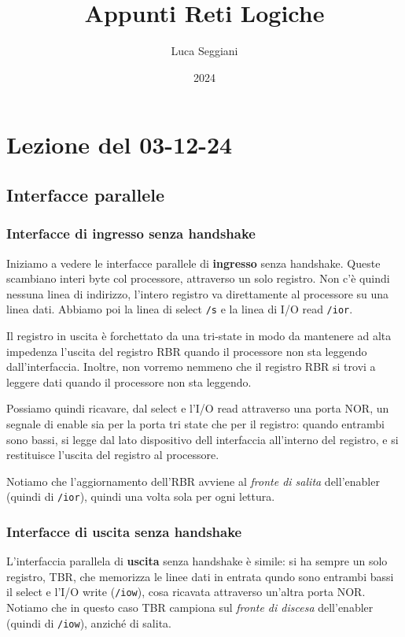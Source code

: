 \documentclass[a4paper,11pt]{article}
\title{Appunti Reti Logiche}
\author{Luca Seggiani}
\date{2024}
\begin{document}
\section{Lezione del 03-12-24}

\thispagestyle{empty}
\pagestyle{fancy}

\subsection{Interfacce parallele}
\subsubsection{Interfacce di ingresso senza handshake}
Iniziamo a vedere le interfacce parallele di \textbf{ingresso} senza handshake.
Queste scambiano interi byte col processore, attraverso un solo registro.
Non c'è quindi nessuna linea di indirizzo, l'intero registro va direttamente al processore su una linea dati.
Abbiamo poi la linea di select \lstinline|/s| e la linea di I/O read \lstinline|/ior|.

Il registro in uscita è forchettato da una tri-state in modo da mantenere ad alta impedenza l'uscita del registro RBR quando il processore non sta leggendo dall'interfaccia. 
Inoltre, non vorremo nemmeno che il registro RBR si trovi a leggere dati quando il processore non sta leggendo.

Possiamo quindi ricavare, dal select e l'I/O read attraverso una porta NOR, un segnale di enable sia per la porta tri state che per il registro: quando entrambi sono bassi, si legge dal lato dispositivo dell interfaccia all'interno del registro, e si restituisce l'uscita del registro al processore.

Notiamo che l'aggiornamento dell'RBR avviene al \textit{fronte di salita} dell'enabler (quindi di \lstinline|/ior|), quindi una volta sola per ogni lettura.

\subsubsection{Interfacce di uscita senza handshake}
L'interfaccia parallela di \textbf{uscita} senza handshake è simile: si ha sempre un solo registro, TBR, che memorizza le linee dati in entrata qundo sono entrambi bassi il select e l'I/O write (\lstinline|/iow|), cosa ricavata attraverso un'altra porta NOR.
Notiamo che in questo caso TBR campiona sul \textit{fronte di discesa} dell'enabler (quindi di \lstinline|/iow|), anziché di salita.
\end{document}
